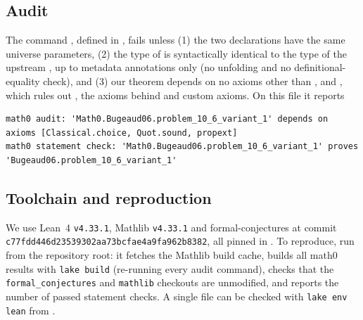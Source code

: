 \documentclass[11pt]{amsart}
\theoremstyle{plain}
\theoremstyle{definition}
\begin{document}
\subsection*{Audit}
The command , defined in , fails unless (1) the two declarations have the same universe parameters, (2) the type of  is syntactically identical to the type of the upstream , up to metadata annotations only (no unfolding and no definitional-equality check), and (3) our theorem depends on no axioms other than ,  and , which rules out , the axioms behind  and custom axioms. On this file it reports
\begin{lstlisting}
math0 audit: 'Math0.Bugeaud06.problem_10_6_variant_1' depends on axioms [Classical.choice, Quot.sound, propext]
math0 statement check: 'Math0.Bugeaud06.problem_10_6_variant_1' proves 'Bugeaud06.problem_10_6_variant_1'
\end{lstlisting}

\subsection*{Toolchain and reproduction}
We use Lean~4 \cite{Lean4} \texttt{v4.33.1}, Mathlib \cite{Mathlib} \texttt{v4.33.1} and formal-conjectures \cite{FC} at commit \texttt{c77fdd446d23539302aa73bcfae4a9fa962b8382}, all pinned in . To reproduce, run  from the repository root: it fetches the Mathlib build cache, builds all math0 results with \texttt{lake build} (re-running every audit command), checks that the \texttt{formal\_conjectures} and \texttt{mathlib} checkouts are unmodified, and reports the number of passed statement checks. A single file can be checked with \texttt{lake env lean} from .
\end{document}
